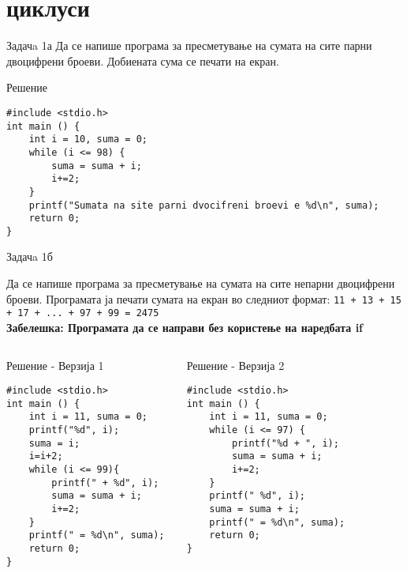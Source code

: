 

\section{циклуси}
\begin{frame}[fragile]{Задачa 1а}
Да се напише програма за пресметување на сумата на сите парни двоцифрени броеви. Добиената сума се печати на екран.
\pause
\begin{exampleblock}{Решение}
	\begin{lstlisting}
#include <stdio.h> 
int main () { 
    int i = 10, suma = 0; 
    while (i <= 98) { 
        suma = suma + i; 
        i+=2; 
    } 
    printf("Sumata na site parni dvocifreni broevi e %d\n", suma); 
    return 0; 
}
\end{lstlisting}
\end{exampleblock}
\end{frame}


\begin{frame}[fragile]{Задачa 1б}
\begin{scriptsize}
Да се напише програма за пресметување на сумата на сите непарни двоцифрени броеви. Програмата ја печати сумата на екран во следниот формат:	\texttt{11 + 13 + 15 + 17 + ... + 97 + 99 = 2475}\\
\textbf{Забелешка: Програмата да се направи без користење на наредбата if}
\end{scriptsize}
\pause
\begin{columns}
\begin{exampleblock}{Решение - Верзија 1}
\begin{lstlisting}
#include <stdio.h>
int main () { 
    int i = 11, suma = 0; 
    printf("%d", i); 
    suma = i; 
    i=i+2; 
    while (i <= 99){ 
        printf(" + %d", i); 
        suma = suma + i; 
        i+=2; 
    } 
    printf(" = %d\n", suma); 
    return 0; 
}
\end{lstlisting}
\end{exampleblock}
\pause
{}
\begin{exampleblock}{Решение - Верзија 2}
\begin{lstlisting}
#include <stdio.h> 
int main () { 
    int i = 11, suma = 0; 
    while (i <= 97) { 
        printf("%d + ", i); 
        suma = suma + i; 
        i+=2; 
    } 
    printf(" %d", i); 
    suma = suma + i; 
    printf(" = %d\n", suma); 
    return 0; 
} 
\end{lstlisting}
\end{exampleblock}
\end{columns}
\end{frame}

